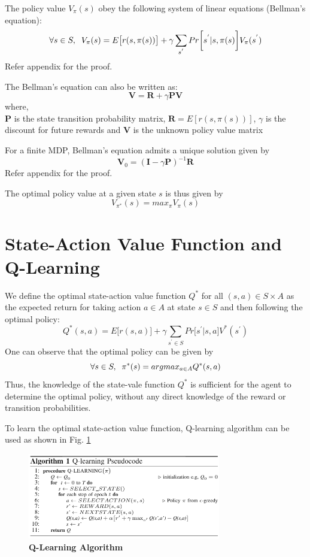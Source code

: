 The policy value  $V_{\pi}(s)$ obey the following system of linear equations (Bellman's equation):
\begin{equation} \label{eq:bellman}
\forall s \in S,\hspace{0.2cm} V_{\pi}(s) = E\big[ r(s,\pi(s))\big] + \gamma \sum_{s^{'}} Pr\bigg[s^{'}|s,\pi(s) \bigg] V_{\pi}(s^{'}) 
\end{equation}
Refer appendix for the proof.

The Bellman's equation can also be written as:
\begin{equation} \label{eq:bellman2}
\textbf{V} = \textbf{R} + \gamma \textbf{PV}
\end{equation}
where,\\ 
$\textbf{P}$ is the state transition probability matrix, 
$\textbf{R} = E[r(s,\pi(s))]$, 
$\gamma$ is the discount for future rewards and $\textbf{V}$ is the unknown policy value matrix

For a finite MDP, Bellman's equation admits a unique solution given by
\begin{equation} \label{eq:bellmanSol}
\textbf{V}_{0} = (\textbf{I}-\gamma \textbf{P})^{-1} \textbf{R} 
\end{equation}
Refer appendix for the proof.

The optimal policy value at a given state $s$ is thus given by 
\begin{equation} \label{eq:optPolVal}
V_{\pi^{*}}(s) = max_{\pi} V_{\pi}(s)
\end{equation}

\section{State-Action Value Function and Q-Learning}

We define the optimal state-action value function $Q^{*}$ for all $(s,a) \in S \times A$  as the expected return for taking action $a \in A$ at state $s \in S$ and then following the optimal policy:
\begin{equation} \label{eq:optimalPol}
Q^{*}(s,a) = E\big[ r(s,a) \big]  + \gamma \sum_{s^{'} \in S} Pr\big[  s^{'} | s, a \big]  V^{*}(s^{'}) 
\end{equation}
One can observe that the optimal policy can be given by
\begin{equation} \label{eq:optimalPolObs}
 \forall s \in S,\hspace{0.2cm} \pi^{*}(s) = argmax_{a \in A} Q^{*}(s,a) 
\end{equation}
Thus, the knowledge of the state-vale function $Q^{*}$ is sufficient for the agent to determine the optimal policy, without any direct knowledge of the reward or transition probabilities.

To learn the optimal state-action value function, Q-learning algorithm can be used as shown in Fig. \ref{fig:qlearning}

\begin{figure}
\centering
\includegraphics[width=0.75\textwidth]{qlearning}
\caption{\textbf{Q-Learning Algorithm}}
\label{fig:qlearning}
\end{figure}